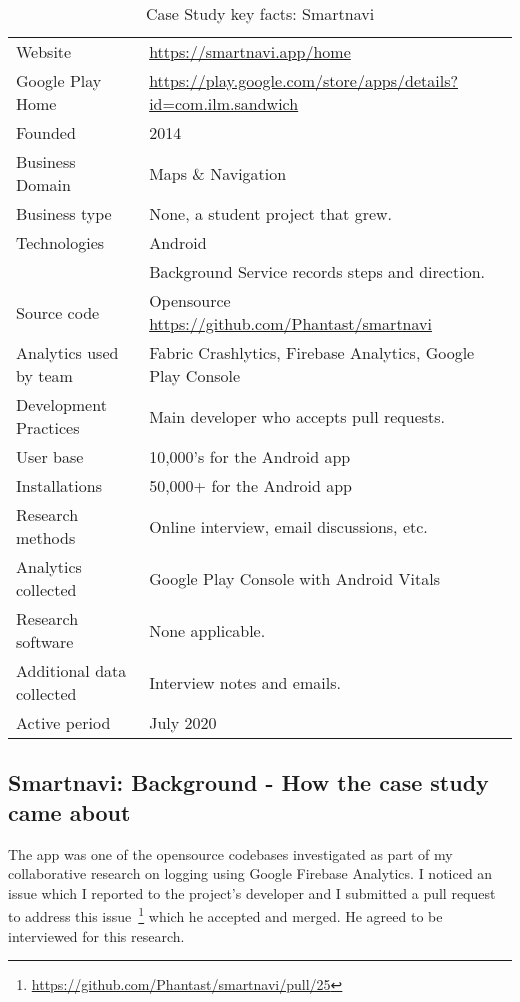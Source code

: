 {\renewcommand{\arraystretch}{0.8}%
\begin{table}[htbp!]
    \centering
    \small
    \setlength{\tabcolsep}{1pt}
    \begin{tabular}{lp{9cm}}
       \toprule
       Website &\url{https://smartnavi.app/home} \\
       Google Play Home & \url{https://play.google.com/store/apps/details?id=com.ilm.sandwich} \\
       Founded & 2014 \\
       Business Domain & Maps \& Navigation \\
       Business type & None, a student project that grew. \\
       Technologies  & Android \\
       & Background Service records steps and direction. \\
       Source code  & Opensource \url{https://github.com/Phantast/smartnavi} \\
       Analytics used by team & Fabric Crashlytics, Firebase Analytics, Google Play Console \\
       Development Practices & Main developer who accepts pull requests. \\
       \midrule
       User base & 10,000's for the Android app \\
       Installations & 50,000+ for the Android app \\
       \midrule
       Research methods &Online interview, email discussions, etc. \\
       Analytics collected &Google Play Console with Android Vitals \\
       Research software & None applicable. \\
       Additional data collected &Interview notes and emails. \\
       Active period & July 2020 \\
       \bottomrule
    \end{tabular}
    \caption{Case Study key facts: Smartnavi}
    \label{tab:smartnavi_anaytics_overview}
\end{table}
}

\subsection{Smartnavi: Background - How the case study came about}
The app was one of the opensource codebases investigated as part of my collaborative research on logging using Google Firebase Analytics. I noticed an issue which I reported to the project's developer and I submitted a pull request to address this issue~\footnote{\url{https://github.com/Phantast/smartnavi/pull/25}} which he accepted and merged. He agreed to be interviewed for this research.


